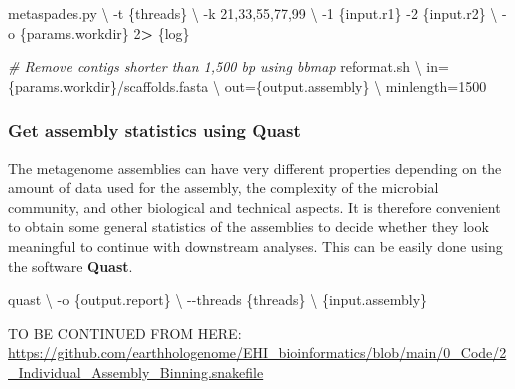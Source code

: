 \documentclass[
]{book}
\newenvironment{Shaded}{\begin{snugshade}}{\end{snugshade}}
\newcommand{\AttributeTok}[1]{\textcolor[rgb]{0.77,0.63,0.00}{#1}}
\newcommand{\CommentTok}[1]{\textcolor[rgb]{0.56,0.35,0.01}{\textit{#1}}}
\newcommand{\DataTypeTok}[1]{\textcolor[rgb]{0.13,0.29,0.53}{#1}}
\newcommand{\DecValTok}[1]{\textcolor[rgb]{0.00,0.00,0.81}{#1}}
\newcommand{\ExtensionTok}[1]{#1}
\newcommand{\NormalTok}[1]{#1}
\newcommand{\OperatorTok}[1]{\textcolor[rgb]{0.81,0.36,0.00}{\textbf{#1}}}
\begin{document}
\begin{Shaded}
\begin{Highlighting}[]
\ExtensionTok{metaspades.py} \DataTypeTok{\textbackslash{}}
    \AttributeTok{{-}t}\NormalTok{ \{threads\} }\DataTypeTok{\textbackslash{}}
    \AttributeTok{{-}k}\NormalTok{ 21,33,55,77,99 }\DataTypeTok{\textbackslash{}}
    \AttributeTok{{-}1}\NormalTok{ \{input.r1\} }\AttributeTok{{-}2}\NormalTok{ \{input.r2\} }\DataTypeTok{\textbackslash{}}
    \AttributeTok{{-}o}\NormalTok{ \{params.workdir\}}
    \DecValTok{2}\OperatorTok{\textgreater{}}\NormalTok{ \{log\}}

\CommentTok{\# Remove contigs shorter than 1,500 bp using bbmap}
\ExtensionTok{reformat.sh} \DataTypeTok{\textbackslash{}}
\NormalTok{    in=\{params.workdir\}/scaffolds.fasta }\DataTypeTok{\textbackslash{}}
\NormalTok{    out=\{output.assembly\} }\DataTypeTok{\textbackslash{}}
\NormalTok{    minlength=1500}
\end{Highlighting}
\end{Shaded}

\hypertarget{get-assembly-statistics-using-quast}{%
\subsubsection{Get assembly statistics using Quast}\label{get-assembly-statistics-using-quast}}

The metagenome assemblies can have very different properties depending on the amount of data used for the assembly, the complexity of the microbial community, and other biological and technical aspects. It is therefore convenient to obtain some general statistics of the assemblies to decide whether they look meaningful to continue with downstream analyses. This can be easily done using the software \textbf{Quast}.

\begin{Shaded}
\begin{Highlighting}[]
\ExtensionTok{quast} \DataTypeTok{\textbackslash{}}
    \AttributeTok{{-}o}\NormalTok{ \{output.report\} }\DataTypeTok{\textbackslash{}}
    \AttributeTok{{-}{-}threads}\NormalTok{ \{threads\} }\DataTypeTok{\textbackslash{}}
\NormalTok{    \{input.assembly\}}
\end{Highlighting}
\end{Shaded}

TO BE CONTINUED FROM HERE: \url{https://github.com/earthhologenome/EHI_bioinformatics/blob/main/0_Code/2_Individual_Assembly_Binning.snakefile}
\end{document}
